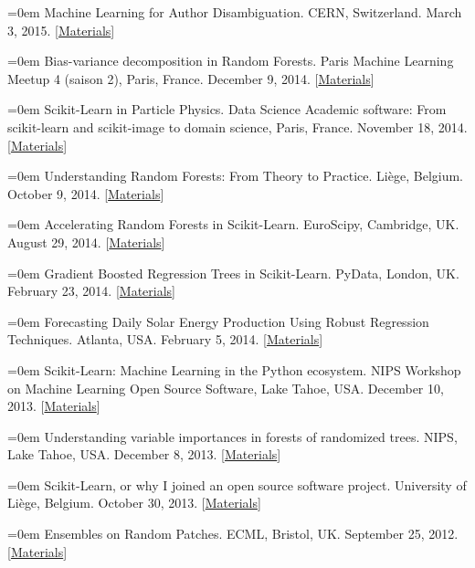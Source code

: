 \documentclass{scrartcl}
\newcommand{\MarginText}[1]{\marginpar{\raggedleft\itshape\small#1}}
\newcommand{\NewPublication}[4]{\noindent\hangindent=0em\hangafter=0 \MarginText{\color{black} #1}{\footnotesize [{\color{Maroon}#2}]} #3 {\footnotesize\color{gray}#4}\vspace{0.5em}}
\begin{document}
\begin{cv}{}
\NewPublication{}{13}{Machine Learning for Author Disambiguation.}{%
CERN, Switzerland.
March 3, 2015.
[\href{https://github.com/glouppe/talk-disambiguation-inspire}{Materials}]}

\NewPublication{}{12}{Bias-variance decomposition in Random Forests.}{%
Paris Machine Learning Meetup 4 (saison 2), Paris, France.
December 9, 2014.
[\href{http://hdl.handle.net/2268/174897}{Materials}]}

\NewPublication{}{11}{Scikit-Learn in Particle Physics.}{%
Data Science Academic software: From scikit-learn and scikit-image to domain science, Paris, France.
November 18, 2014.
[\href{https://github.com/glouppe/talk-cds2014}{Materials}]}

\NewPublication{}{10}{Understanding Random Forests: From Theory to Practice.}{%
Li{\`e}ge, Belgium.
October 9, 2014.
[\href{https://github.com/glouppe/phd-thesis}{Materials}]}

\NewPublication{}{9}{Accelerating Random Forests in Scikit-Learn.}{%
EuroScipy, Cambridge, UK.
August 29, 2014.
[\href{https://github.com/glouppe/talk-euroscipy2014}{Materials}]}

\NewPublication{}{8}{Gradient Boosted Regression Trees in Scikit-Learn.}{%
PyData, London, UK.
February 23, 2014.
[\href{https://github.com/glouppe/tutorial-pydata2014}{Materials}]}

\NewPublication{}{7}{Forecasting Daily Solar Energy Production Using Robust Regression Techniques.}{%
Atlanta, USA.
February 5, 2014.
[\href{http://hdl.handle.net/2268/162797}{Materials}]}

\NewPublication{}{6}{Scikit-Learn: Machine Learning in the Python ecosystem.}{%
NIPS Workshop on Machine Learning Open Source Software,
Lake Tahoe, USA.
December 10, 2013.
[\href{http://hdl.handle.net/2268/157487}{Materials}]}

\NewPublication{}{5}{Understanding variable importances in forests of randomized trees.}{%
NIPS,
Lake Tahoe, USA.
December 8, 2013.
[\href{http://hdl.handle.net/2268/155642}{Materials}]}

\NewPublication{}{4}{Scikit-Learn, or why I joined an open source software project.}{%
University of Li{\`e}ge, Belgium.
October 30, 2013.
[\href{http://www.slideshare.net/glouppe/scikitlearn-or-why-i-joined-an-open-source-software-project}{Materials}]}

\NewPublication{}{3}{Ensembles on Random Patches.}{%
ECML,
Bristol, UK.
September 25, 2012.
[\href{http://hdl.handle.net/2268/130099}{Materials}]}


\end{cv}
\end{document}
